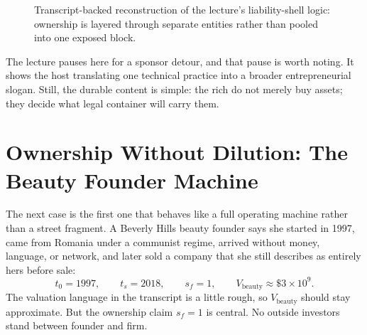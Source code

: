 \begin{figure}[h]
\centering
{}
\caption{Transcript-backed reconstruction of the lecture's liability-shell logic: ownership is layered through separate entities rather than pooled into one exposed block.}
\end{figure}

The lecture pauses here for a sponsor detour, and that pause is worth noting. It shows the host translating one technical practice into a broader entrepreneurial slogan. Still, the durable content is simple: the rich do not merely buy assets; they decide what legal container will carry them.

\section{Ownership Without Dilution: The Beauty Founder Machine}

The next case is the first one that behaves like a full operating machine rather than a street fragment. A Beverly Hills beauty founder says she started in 1997, came from Romania under a communist regime, arrived without money, language, or network, and later sold a company that she still describes as entirely hers before sale:
\begin{equation}
t_0 = 1997,\qquad t_s = 2018,\qquad s_f = 1,\qquad V_{\mathrm{beauty}} \approx \$3 \times 10^{9}.
\end{equation}
The valuation language in the transcript is a little rough, so \(V_{\mathrm{beauty}}\) should stay approximate. But the ownership claim \(s_f=1\) is central. No outside investors stand between founder and firm.


